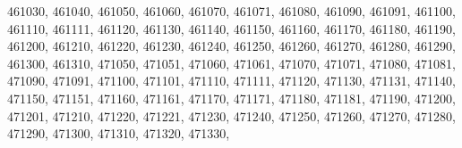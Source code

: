\textquotesingle{}461030\textquotesingle{}, \textquotesingle{}461040\textquotesingle{}, \textquotesingle{}461050\textquotesingle{}, \textquotesingle{}461060\textquotesingle{}, \textquotesingle{}461070\textquotesingle{}, \textquotesingle{}461071\textquotesingle{}, \textquotesingle{}461080\textquotesingle{}, \textquotesingle{}461090\textquotesingle{}, \textquotesingle{}461091\textquotesingle{}, \textquotesingle{}461100\textquotesingle{}, \textquotesingle{}461110\textquotesingle{}, \textquotesingle{}461111\textquotesingle{}, \textquotesingle{}461120\textquotesingle{}, \textquotesingle{}461130\textquotesingle{}, \textquotesingle{}461140\textquotesingle{}, \textquotesingle{}461150\textquotesingle{}, \textquotesingle{}461160\textquotesingle{}, \textquotesingle{}461170\textquotesingle{}, \textquotesingle{}461180\textquotesingle{}, \textquotesingle{}461190\textquotesingle{}, \textquotesingle{}461200\textquotesingle{}, \textquotesingle{}461210\textquotesingle{}, \textquotesingle{}461220\textquotesingle{}, \textquotesingle{}461230\textquotesingle{}, \textquotesingle{}461240\textquotesingle{}, \textquotesingle{}461250\textquotesingle{}, \textquotesingle{}461260\textquotesingle{}, \textquotesingle{}461270\textquotesingle{}, \textquotesingle{}461280\textquotesingle{}, \textquotesingle{}461290\textquotesingle{}, \textquotesingle{}461300\textquotesingle{}, \textquotesingle{}461310\textquotesingle{}, \textquotesingle{}471050\textquotesingle{}, \textquotesingle{}471051\textquotesingle{}, \textquotesingle{}471060\textquotesingle{}, \textquotesingle{}471061\textquotesingle{}, \textquotesingle{}471070\textquotesingle{}, \textquotesingle{}471071\textquotesingle{}, \textquotesingle{}471080\textquotesingle{}, \textquotesingle{}471081\textquotesingle{}, \textquotesingle{}471090\textquotesingle{}, \textquotesingle{}471091\textquotesingle{}, \textquotesingle{}471100\textquotesingle{}, \textquotesingle{}471101\textquotesingle{}, \textquotesingle{}471110\textquotesingle{}, \textquotesingle{}471111\textquotesingle{}, \textquotesingle{}471120\textquotesingle{}, \textquotesingle{}471130\textquotesingle{}, \textquotesingle{}471131\textquotesingle{}, \textquotesingle{}471140\textquotesingle{}, \textquotesingle{}471150\textquotesingle{}, \textquotesingle{}471151\textquotesingle{}, \textquotesingle{}471160\textquotesingle{}, \textquotesingle{}471161\textquotesingle{}, \textquotesingle{}471170\textquotesingle{}, \textquotesingle{}471171\textquotesingle{}, \textquotesingle{}471180\textquotesingle{}, \textquotesingle{}471181\textquotesingle{}, \textquotesingle{}471190\textquotesingle{}, \textquotesingle{}471200\textquotesingle{}, \textquotesingle{}471201\textquotesingle{}, \textquotesingle{}471210\textquotesingle{}, \textquotesingle{}471220\textquotesingle{}, \textquotesingle{}471221\textquotesingle{}, \textquotesingle{}471230\textquotesingle{}, \textquotesingle{}471240\textquotesingle{}, \textquotesingle{}471250\textquotesingle{}, \textquotesingle{}471260\textquotesingle{}, \textquotesingle{}471270\textquotesingle{}, \textquotesingle{}471280\textquotesingle{}, \textquotesingle{}471290\textquotesingle{}, \textquotesingle{}471300\textquotesingle{}, \textquotesingle{}471310\textquotesingle{}, \textquotesingle{}471320\textquotesingle{}, \textquotesingle{}471330\textquotesingle{}, 